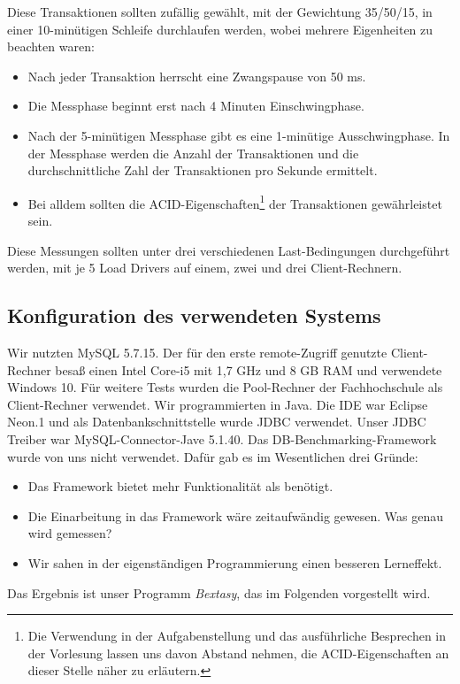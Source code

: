 \documentclass[a4paper, bibliography=totoc, 12pt]{scrartcl}
\begin{document}
\noindent
Diese Transaktionen sollten zufällig gewählt, mit der Gewichtung 35/50/15, in einer 10-minütigen Schleife durchlaufen werden, wobei mehrere Eigenheiten zu beachten waren:
\begin{itemize}
\itemsep0pt
\item Nach jeder Transaktion herrscht eine Zwangspause von 50 ms.
\item Die Messphase beginnt erst nach 4 Minuten \glqq Einschwingphase\grqq .
\item Nach der 5-minütigen Messphase gibt es eine 1-minütige \glqq Ausschwingphase\grqq . In der Messphase werden die Anzahl der Transaktionen und die durchschnittliche Zahl der Transaktionen pro Sekunde ermittelt. %
\item Bei alldem sollten die ACID-Eigenschaften\footnote{Die Verwendung in der Aufgabenstellung und das ausführliche Besprechen in der Vorlesung lassen uns davon Abstand nehmen, die ACID-Eigenschaften an dieser Stelle näher zu erläutern.} der Transaktionen gewährleistet sein.
\end{itemize}

\noindent
Diese Messungen sollten unter drei verschiedenen Last-Bedingungen durchgeführt werden, mit je 5 Load Drivers auf einem, zwei und drei Client-Rechnern. 

\subsection{Konfiguration des verwendeten Systems}
Wir nutzten MySQL 5.7.15. Der für den erste remote-Zugriff genutzte Client-Rechner besaß einen Intel Core-i5 mit 1,7 GHz und 8 GB RAM und verwendete Windows 10. Für weitere Tests wurden die Pool-Rechner der Fachhochschule als Client-Rechner verwendet. Wir programmierten in Java. Die IDE war Eclipse Neon.1 und als Datenbankschnittstelle wurde JDBC verwendet. Unser JDBC Treiber war MySQL-Connector-Jave 5.1.40. Das DB-Benchmarking-Framework wurde von uns nicht verwendet. Dafür gab es im Wesentlichen drei Gründe: 
\begin{itemize}
\itemsep0pt
\item Das Framework bietet mehr Funktionalität als benötigt.
\item Die Einarbeitung in das Framework wäre zeitaufwändig gewesen. Was genau wird gemessen?
\item Wir sahen in der eigenständigen Programmierung einen besseren Lerneffekt.
\end{itemize}%
\noindent
Das Ergebnis ist unser Programm \emph{Bextasy}, das im Folgenden vorgestellt wird.
\end{document}
